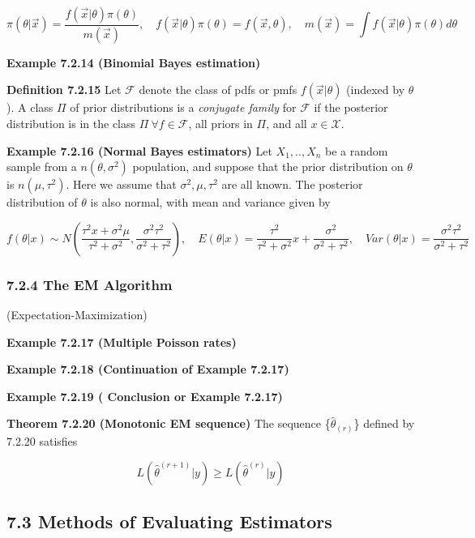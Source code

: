 \documentclass[6pt,Portrait]{article}
\begin{document}
\[\pi(\theta|\vec x)=\frac{f(\vec x|\theta)\pi(\theta)}{m(\vec x)},\quad f(\vec x|\theta)\pi(\theta)=f(\vec x,\theta),\quad m(\vec x)=\int f(\vec x|\theta)\pi(\theta)d\theta\]

\textbf{Example 7.2.14 (Binomial Bayes estimation)}

\textbf{Definition 7.2.15} Let \(\mathcal{F}\) denote the class of pdfs
or pmfs \(f(\vec x|\theta)\) (indexed by \(\theta\)). A class \(\Pi\) of
prior distributions is a \emph{conjugate family} for \(\mathcal{F}\) if
the posterior distribution is in the class
\(\Pi\ \forall f\in\mathcal{F}\), all priors in \(\Pi\), and all
\(x\in\mathcal{X}\).

\textbf{Example 7.2.16 (Normal Bayes estimators)} Let \(X_1,..,X_n\) be
a random sample from a \(n(\theta,\sigma^2)\) population, and suppose
that the prior distribution on \(\theta\) is \(n(\mu,\tau^2)\). Here we
assume that \(\sigma^2, \mu, \tau^2\) are all known. The posterior
distribution of \(\theta\) is also normal, with mean and variance given
by

\[f(\theta|x)\sim N(\frac{\tau^2x+\sigma^2\mu}{\tau^2+\sigma^2},\frac{\sigma^2\tau^2}{\sigma^2+\tau^2}),\quad E(\theta|x)=\frac{\tau^2}{\tau^2+\sigma^2}x+\frac{\sigma^2}{\sigma^2+\tau^2},\quad Var(\theta|x)=\frac{\sigma^2\tau^2}{\sigma^2+\tau^2}\]

\hypertarget{the-em-algorithm}{%
\subsubsection{7.2.4 The EM Algorithm}\label{the-em-algorithm}}

(Expectation-Maximization)

\textbf{Example 7.2.17 (Multiple Poisson rates)}

\textbf{Example 7.2.18 (Continuation of Example 7.2.17)}

\textbf{Example 7.2.19 ( Conclusion or Example 7.2.17)}

\textbf{Theorem 7.2.20 (Monotonic EM sequence)} The sequence
\{\(\hat\theta_{(r)}\)\} defined by 7.2.20 satisfies

\[L\left(\hat\theta^{(r+1)}|y\right)\ge L\left(\hat\theta^{(r)}|y\right)\]

\hypertarget{methods-of-evaluating-estimators}{%
\subsection{7.3 Methods of Evaluating
Estimators}\label{methods-of-evaluating-estimators}}
\end{document}
